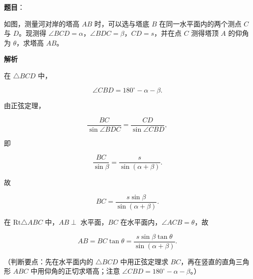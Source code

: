 \begin{answer}

\textbf{题目}：

如图，测量河对岸的塔高 $AB$ 时，可以选与塔底 $B$ 在同一水平面内的两个测点 $C$ 与 $D$。现测得 $\angle BCD=\alpha$，$\angle BDC=\beta$，$CD=s$，并在点 $C$ 测得塔顶 $A$ 的仰角为 $\theta$，求塔高 $AB$。
\nopagebreak[4]
\begin{center}\end{center}
\nopagebreak[4]
\textbf{解析}

在 $\triangle BCD$ 中，

\nopagebreak[4]
\[\angle CBD=180^\circ-\alpha-\beta.\]

由正弦定理，

\nopagebreak[4]
\[\frac{BC}{\sin\angle BDC}=\frac{CD}{\sin\angle CBD},\]

即

\nopagebreak[4]
\[\frac{BC}{\sin\beta}=\frac{s}{\sin(\alpha+\beta)}.\]

故

\nopagebreak[4]
\[BC=\frac{s\sin\beta}{\sin(\alpha+\beta)}.\]

在 $\mathrm{Rt}\triangle ABC$ 中，$AB\perp$ 水平面，$BC$ 在水平面内，$\angle ACB=\theta$，故

\nopagebreak[4]
\[AB=BC\tan\theta=\frac{s\sin\beta\tan\theta}{\sin(\alpha+\beta)}.\]

（判断要点：先在水平面内的 $\triangle BCD$ 中用正弦定理求 $BC$，再在竖直的直角三角形 $ABC$ 中用仰角的正切求塔高；注意 $\angle CBD=180^\circ-\alpha-\beta$。）


\end{answer}

